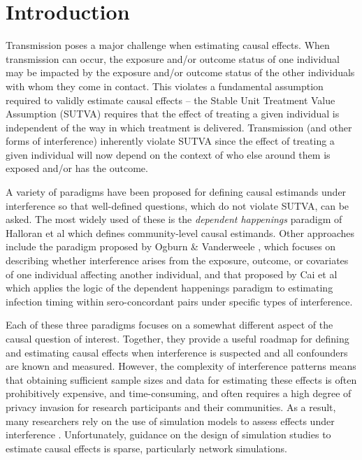 \documentclass{article}
\theoremstyle{definition}
\begin{document}
\section{Introduction}
Transmission poses a major challenge when estimating causal effects. When transmission can occur, the exposure and/or outcome status of one individual may be impacted by the exposure and/or outcome status of the other individuals with whom they come in contact. This violates a fundamental assumption required to validly estimate causal effects – the Stable Unit Treatment Value Assumption (SUTVA) requires that the effect of treating a given individual is independent of the way in which treatment is delivered. Transmission (and other forms of interference) inherently violate SUTVA since the effect of treating a given individual will now depend on the context of who else around them is exposed and/or has the outcome. 

A variety of paradigms have been proposed for defining causal estimands under interference so that well-defined questions, which do not violate SUTVA, can be asked. The most widely used of these is the \emph{dependent happenings} paradigm of Halloran et al  \cite{halloran_study_1991} which defines community-level causal estimands. Other approaches include the paradigm proposed by Ogburn \& Vanderweele \cite{ogburn_causal_2014}, which focuses on describing whether interference arises from the exposure, outcome, or covariates of one individual affecting another individual, and that proposed by Cai et al \cite{cai_causal_2021} which applies the logic of the dependent happenings paradigm to estimating infection timing within sero-concordant pairs under specific types of interference. 

Each of these three paradigms focuses on a somewhat different aspect of the causal question of interest. Together, they provide a useful roadmap for defining and estimating causal effects when interference is suspected and all confounders are known and measured. However, the complexity of interference patterns means that obtaining sufficient sample sizes and data for estimating these effects is often prohibitively expensive, and time-consuming, and often requires a high degree of privacy invasion for research participants and their communities. As a result, many researchers rely on the use of simulation models to assess effects under interference \cite{murray_emulating_2021, buchanan_disseminated_2021}. Unfortunately, guidance on the design of simulation studies to estimate causal effects is sparse, particularly network simulations.
\end{document}
